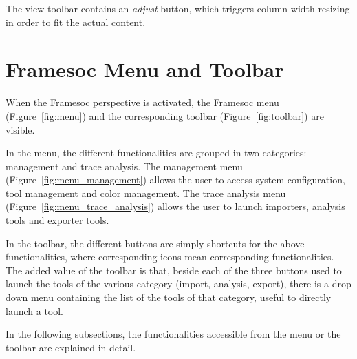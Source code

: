 \documentclass[twoside]{article}
\begin{document}
\begin{sloppypar}
The view toolbar contains an \emph{adjust} button, which triggers column width resizing in order to fit the actual content.

\section{Framesoc Menu and Toolbar}
\label{sec:menu}

When the Framesoc perspective is activated, the Framesoc menu (Figure~\ref{fig:menu}) and the corresponding toolbar (Figure~\ref{fig:toolbar}) are visible. 

In the menu, the different functionalities are grouped in two categories: management and trace analysis.
The management menu (Figure~\ref{fig:menu_management}) allows the user to access system configuration, tool management and color management.
The trace analysis menu (Figure~\ref{fig:menu_trace_analysis}) allows the user to launch importers, analysis tools and exporter tools.

In the toolbar, the different buttons are simply shortcuts for the above functionalities, where corresponding icons mean corresponding functionalities.
The added value of the toolbar is that, beside each of the three buttons used to launch the tools of the various category (import, analysis, export), there is a drop down menu containing the list of the tools of that category, useful to directly launch a tool.

In the following subsections, the functionalities accessible from the menu or the toolbar are explained in detail.


\end{sloppypar}
\end{document}
